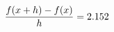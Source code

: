 \documentclass[preview]{standalone}
\begin{document}
\begin{align*}
\special{dvisvgm:raw <g id='unique000'>}\frac{f(x+h)-f(x)}{h} = 2.152\special{dvisvgm:raw </g>}
\end{align*}
\end{document}
